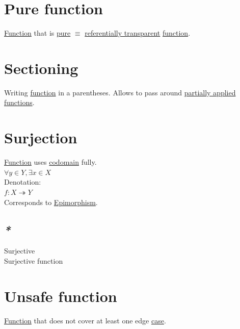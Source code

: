 \documentclass[a4paper,14pt,oneside]{book}
\begin{document}
\section{\label{org710f5cf}Pure function}
\label{sec:org558f3d8}

\hyperref[org9530a6b]{Function} that is \hyperref[org16d9511]{pure} \(\equiv\) \hyperref[orgc4acbfd]{referentially transparent} \hyperref[org9530a6b]{function}.\\

\section{\label{orgd4bc124}Sectioning}
\label{sec:orgffd7cdf}
Writing \hyperref[org9530a6b]{function} in a parentheses. Allows to pass around \hyperref[org9bac7bd]{partially applied} \hyperref[org788d18f]{functions}.\\

\section{\label{orgaed9ca9}Surjection}
\label{sec:orgbcb1b78}
\hyperref[org9530a6b]{Function} uses \hyperref[orgaa1c608]{codomain} fully.\\

\(\forall y \in Y, \exists x \in X\)\\

Denotation:\\
\(f : X \twoheadrightarrow Y\)\\

Corresponds to \hyperref[orge1e4bc2]{Epimorphism}.\\

\subsection{\emph{*}}
\label{sec:org93db7a1}

\label{orgfc75633}Surjective\\
\label{org853e585}Surjective function\\

\section{\label{org6d24e78}Unsafe function}
\label{sec:orgefaaf1c}
\hyperref[org9530a6b]{Function} that does not cover at least one edge \hyperref[orgb1cd8b6]{case}.\\
\end{document}
